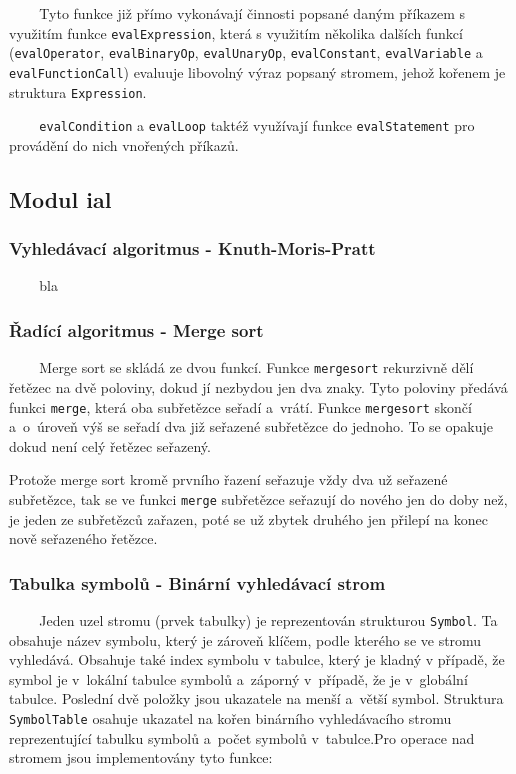 \documentclass[12pt,a4paper,titlepage,final]{article}
\begin{document}
~ ~ ~Tyto funkce již přímo vykonávají činnosti popsané daným příkazem 
s využitím funkce \texttt{evalExpression}, která s využitím několika
dalších funkcí (\texttt{evalOperator}, \texttt{evalBinaryOp}, 
\texttt{evalUnaryOp}, \texttt{evalConstant}, \texttt{evalVariable} a 
\texttt{evalFunctionCall}) evaluuje libovolný výraz popsaný stromem, 
jehož kořenem je struktura \texttt{Expression}.

~ ~ ~\texttt{evalCondition} a \texttt{evalLoop} taktéž využívají funkce
\texttt{evalStatement} pro provádění do nich vnořených příkazů.

\subsection{Modul ial}
\subsubsection{Vyhledávací algoritmus - Knuth-Moris-Pratt}
~ ~ ~bla
\subsubsection{Řadící algoritmus - Merge sort}
~ ~ ~Merge sort se skládá ze dvou funkcí. Funkce \texttt{mergesort} rekurzivně dělí 
řetězec na dvě poloviny, dokud jí nezbydou jen dva znaky. Tyto poloviny  předává funkci
\texttt{merge}, která oba subřetězce seřadí a~vrátí. Funkce \texttt{mergesort} skončí 
a~o~úroveň výš se seřadí dva již seřazené subřetězce do jednoho. To se opakuje dokud 
není celý řetězec seřazený.

Protože merge sort kromě prvního řazení seřazuje vždy dva už seřazené subřetězce, 
tak se ve funkci \texttt{merge} subřetězce seřazují do nového jen do doby než, 
je jeden ze subřetězců zařazen, poté se už zbytek druhého jen přilepí na konec nově 
seřazeného řetězce.  
\subsubsection{Tabulka symbolů - Binární vyhledávací strom}
~ ~ ~Jeden uzel stromu (prvek tabulky) je reprezentován strukturou \texttt{Symbol}.
Ta obsahuje název symbolu, který je zároveň klíčem, podle kterého se ve stromu vyhledává. 
Obsahuje také index symbolu v tabulce, který je kladný v případě, že symbol je 
v~lokální tabulce symbolů a~záporný v~případě, že je v~globální tabulce. Poslední dvě 
položky jsou ukazatele na menší a~větší symbol. Struktura \texttt{SymbolTable} osahuje 
ukazatel na kořen binárního vyhledávacího stromu reprezentující tabulku symbolů a~počet 
symbolů v~tabulce.\newline\newline Pro operace nad stromem jsou implementovány tyto funkce:
\medskip
\end{document}
